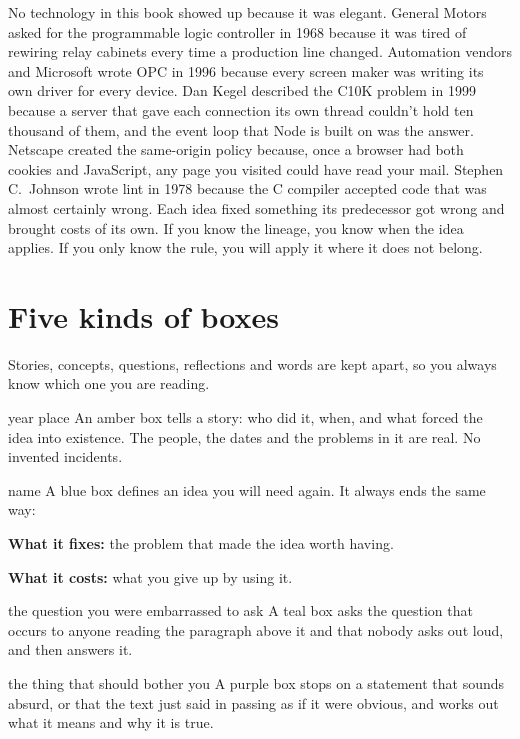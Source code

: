 No technology in this book showed up because it was elegant. General Motors
asked for the programmable logic controller in 1968 because it was tired of
rewiring relay cabinets every time a production line changed. Automation
vendors and Microsoft wrote OPC in 1996 because every screen maker was writing
its own driver for every device. Dan Kegel described the C10K problem in 1999
because a server that gave each connection its own thread couldn't hold ten
thousand of them, and the event loop that Node is built on was the answer.
Netscape created the same-origin policy because, once a browser had both
cookies and JavaScript, any page you visited could have read your mail.
Stephen C.\ Johnson wrote lint in 1978 because the C compiler accepted code that
was almost certainly wrong. Each idea fixed something its predecessor got wrong
and brought costs of its own. If you know the lineage, you know when the idea
applies. If you only know the rule, you will apply it where it does not belong.

\section*{Five kinds of boxes}

Stories, concepts, questions, reflections and words are kept apart, so you
always know which one you are reading.

\begin{history}{year \textperiodcentered{} place}
An amber box tells a story: who did it, when, and what forced the idea into
existence. The people, the dates and the problems in it are real. No invented
incidents.
\end{history}

\begin{concept}{name}
A blue box defines an idea you will need again. It always ends the same way:

\textbf{What it fixes:} the problem that made the idea worth having.

\textbf{What it costs:} what you give up by using it.
\end{concept}

\begin{question}{the question you were embarrassed to ask}
A teal box asks the question that occurs to anyone reading the paragraph above
it and that nobody asks out loud, and then answers it.
\end{question}

\begin{reflection}{the thing that should bother you}
A purple box stops on a statement that sounds absurd, or that the text just said
in passing as if it were obvious, and works out what it means and why it is
true.
\end{reflection}

